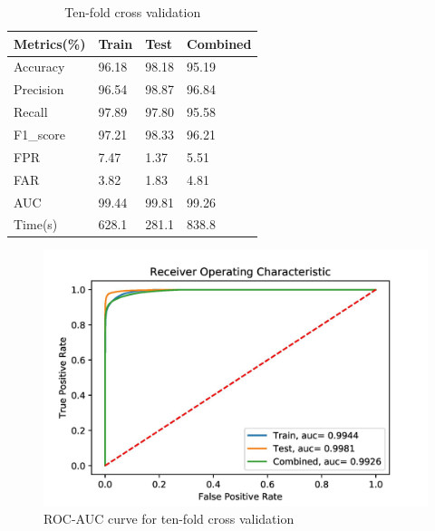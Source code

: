 \documentclass[14pt, conference]{IEEEtran}
\begin{document}
\begin{table}
\normalsize
\centering
\caption{Ten-fold cross validation}
\label{tenFoldCrossValidation}
\renewcommand{\arraystretch}{1.2}
\begin{tabular}{|C{2.3cm}|C{1.3cm}|C{1.3cm}|C{1.8cm}|}
\hline
\textbf{Metrics(\%)} & \textbf{Train} & \textbf{Test} & \textbf{Combined}\\ \hline
Accuracy & 96.18 & 98.18 & 95.19 \\ \hline
Precision & 96.54 & 98.87& 96.84\\ \hline
Recall  & 97.89 & 97.80 & 95.58\\ \hline
F1\_score  & 97.21 & 98.33 & 96.21\\ \hline
FPR & 7.47 & 1.37 & 5.51\\ \hline
FAR & 3.82 & 1.83 & 4.81 \\ \hline
AUC & 99.44 & 99.81 & 99.26\\ \hline
Time(s) & 628.1 & 281.1 & 838.8\\ \hline
\end{tabular}
\end{table}


\begin{figure}[!tbh]
\centering
  \includegraphics[width=\linewidth]{images/roc_ten.jpg}
  \caption{ROC-AUC curve for ten-fold cross validation}
\label{fig:tenFold}
\end{figure}
\end{document}
